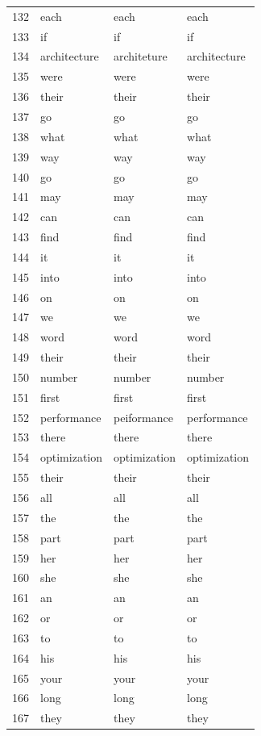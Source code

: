 \begin{longtable}{clll}
    132 & each & each & each \\
    133 & if & if & if \\
    134 & architecture & architeture & architecture \\
    135 & were & were & were \\
    136 & their & their & their \\
    137 & go & go & go \\
    138 & what & what & what \\
    139 & way & way & way \\
    140 & go & go & go \\
    141 & may & may & may \\
    142 & can & can & can \\
    143 & find & find & find \\
    144 & it & it & it \\
    145 & into & into & into \\
    146 & on & on & on \\
    147 & we & we & we \\
    148 & word & word & word \\
    149 & their & their & their \\
    150 & number & number & number \\
    151 & first & first & first \\
    152 & performance & peiformance & performance \\
    153 & there & there & there \\
    154 & optimization & optimization & optimization \\
    155 & their & their & their \\
    156 & all & all & all \\
    157 & the & the & the \\
    158 & part & part & part \\
    159 & her & her & her \\
    160 & she & she & she \\
    161 & an & an & an \\
    162 & or & or & or \\
    163 & to & to & to \\
    164 & his & his & his \\
    165 & your & your & your \\
    166 & long & long & long \\
    167 & they & they & they \\

\end{longtable}
